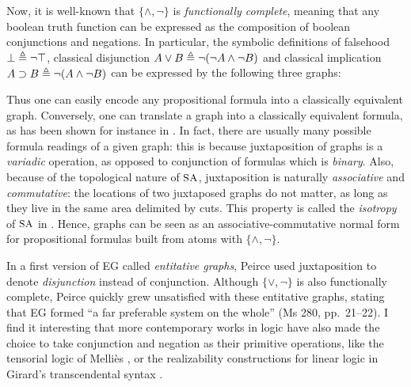 Now, it is well-known that $\{\land,\neg\}$ is \emph{functionally complete},
meaning that any boolean truth function can be expressed as the composition of
boolean conjunctions and negations. In particular, the symbolic definitions of
falsehood $\bot \triangleq \neg\top$, classical disjunction $A \lor B \triangleq
\neg(\neg A \land \neg B)$ and classical implication $A \supset B \triangleq \neg (A
\land \neg B)$ can be expressed by the following three graphs:
Thus one can easily encode any propositional formula into a classically
equivalent graph. Conversely, one can translate a graph into a classically
equivalent formula, as has been shown for instance in
. In fact, there are usually many
possible formula readings of a given graph: this is because juxtaposition of
graphs is a \emph{variadic} operation, as opposed to conjunction of formulas
which is \emph{binary}. Also, because of the topological nature of $\small\textsc{SA}$,
juxtaposition is naturally \emph{associative} and \emph{commutative}: the
locations of two juxtaposed graphs do not matter, as long as they live in the
same area delimited by cuts. This property is called the \emph{isotropy} of
$\small\textsc{SA}$ in \cite{minghui_graphical_2019}. Hence, graphs can be seen as an
associative-commutative normal form for propositional formulas built from atoms
with $\{\land,\neg\}$.

\begin{remark}
  
  In a first version of EG called \emph{entitative graphs}, Peirce used
  juxtaposition to denote \emph{disjunction} instead of conjunction. Although
  $\{\lor,\neg\}$ is also functionally complete, Peirce quickly grew unsatisfied
  with these entitative graphs, stating that EG formed ``a far preferable system
  on the whole'' (Ms 280, pp.~21--22). I find it interesting that more
  contemporary works in logic have also made the choice to take conjunction and
  negation as their primitive operations, like the tensorial logic of Melliès
  \cite{mellies_micrological_2017}, or the realizability constructions for
  linear logic in Girard's transcendental syntax \cite{eng_stellar_2020}.
\end{remark}

